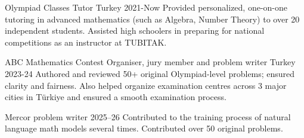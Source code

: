 


\begin{cvhonors}

\mycvhonorwithdesc
    {Olympiad Classes}
    {Tutor}
    {Turkey}
    {2021-Now}
  {Provided personalized, one-on-one tutoring in advanced mathematics (such as Algebra, Number Theory) to over 20 independent students. Assisted high schoolers in preparing for national competitions as an instructor at TUBITAK.} %

\mycvhonorwithdesc
    {ABC Mathematics Contest}
    {Organiser, jury member and problem writer}
    {Turkey}
    {2023-24}
    {Authored and reviewed 50+ original Olympiad-level problems; ensured clarity and fairness. Also helped organize examination centres across 3 major cities in Türkiye and ensured a smooth examination process.}%

\mycvhonorwithdesc
    {Mercor}
    {problem writer}
    {}
    {2025–26}
    {Contributed to the training process of natural language math models several times. Contributed over 50 original problems.}


\end{cvhonors}